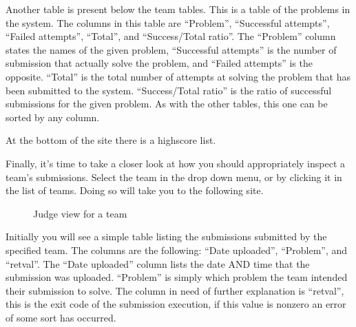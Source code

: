\bigskip

Another table is present below the team tables. This is a table of the
problems in the system. The columns in this table are
{\textquotedblleft}Problem{\textquotedblright},
{\textquotedblleft}Successful attempts{\textquotedblright},
{\textquotedblleft}Failed attempts{\textquotedblright},
{\textquotedblleft}Total{\textquotedblright}, and
{\textquotedblleft}Success/Total ratio{\textquotedblright}. The
{\textquotedblleft}Problem{\textquotedblright} column states the names
of the given problem, {\textquotedblleft}Successful
attempts{\textquotedblright} is the number of submission that actually
solve the problem, and {\textquotedblleft}Failed
attempts{\textquotedblright} is the opposite.
{\textquotedblleft}Total{\textquotedblright} is the total number of
attempts at solving the problem that has been submitted to the system.
{\textquotedblleft}Success/Total ratio{\textquotedblright} is the ratio
of successful submissions for the given problem. As with the other
tables, this one can be sorted by any column. 


\bigskip

At the bottom of the site there is a highscore list. 


\bigskip

Finally, it{\textquoteright}s time to take a closer look at how you
should appropriately inspect a team{\textquoteright}s submissions.
Select the team in the drop down menu, or by clicking it in the list of
teams. Doing so will take you to the following site. 

\begin{figure}
\centering
	\caption{Judge view for a team}
	\label{fig:judgeViewTeam}
\end{figure}

\bigskip

Initially you will see a simple table listing the submissions submitted
by the specified team. The columns are the following:
{\textquotedblleft}Date uploaded{\textquotedblright},
{\textquotedblleft}Problem{\textquotedblright}, and
{\textquotedblleft}retval{\textquotedblright}. The
{\textquotedblleft}Date uploaded{\textquotedblright} column lists the
date AND time that the submission was uploaded.
{\textquotedblleft}Problem{\textquotedblright} is simply which problem
the team intended their submission to solve. The column in need of
further explanation is {\textquotedblleft}retval{\textquotedblright},
this is the exit code of the submission execution, if this value is
nonzero an error of some sort has occurred. 


